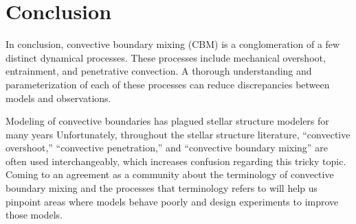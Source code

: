 \section{Conclusion}
\label{sec:conclusions}
In conclusion, convective boundary mixing (CBM) is a conglomeration of a few distinct dynamical processes.
These processes include mechanical overshoot, entrainment, and penetrative convection.
A thorough understanding and parameterization of each of these processes can reduce discrepancies between models and observations.

Modeling of convective boundaries has plagued stellar structure modelers for many years 
Unfortunately, throughout the stellar structure literature, ``convective overshoot,'' ``convective penetration,'' and ``convective boundary mixing'' are often used interchangeably, which increases confusion regarding this tricky topic.
Coming to an agreement as a community about the terminology of convective boundary mixing and the processes that terminology refers to will help us pinpoint areas where models behave poorly and design experiments to improve those models.
